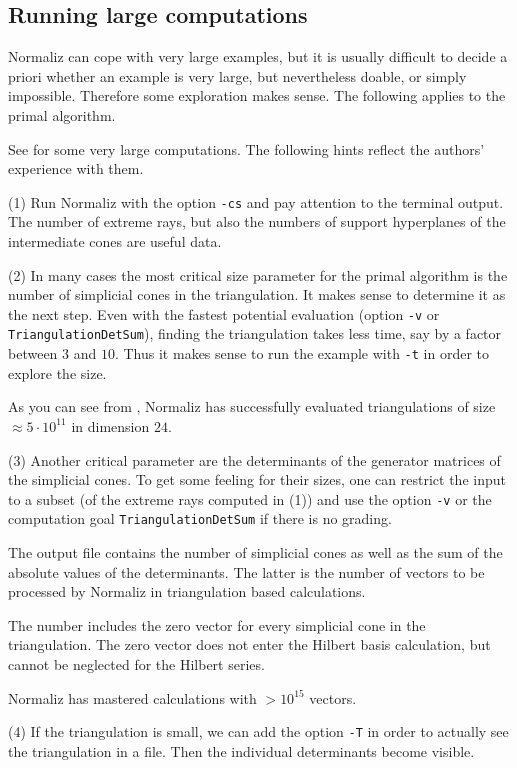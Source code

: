 \documentclass[12pt,a4paper]{scrartcl}
\theoremstyle{definition}
\def\ttt{\texttt}
\begin{document}
\subsection{Running large computations}\label{Large}

Normaliz can cope with very large examples, but  it
is usually difficult to decide a priori whether an example is
very large, but nevertheless doable, or simply impossible.
Therefore some exploration makes sense. The following applies to the primal algorithm.

See \cite{BIS} for some very large computations. The following
hints reflect the authors' experience with them.

(1) Run Normaliz with the option \ttt{-cs} and pay attention
to the terminal output. The number of extreme rays, but also
the numbers of support hyperplanes of the intermediate cones
are useful data.

(2) In many cases the most critical size parameter for the primal algorithm is the
number of simplicial cones in the triangulation. It makes sense
to determine it as the next step. Even with the fastest
potential evaluation (option \ttt{-v} or \verb|TriangulationDetSum|), finding the
triangulation takes less time, say by a factor between $3$ and
$10$. Thus it makes sense to run the example with \ttt{-t} in
order to explore the size.

As you can see from \cite{BIS}, Normaliz has successfully
evaluated triangulations of size $\approx 5\cdot 10^{11}$ in
dimension $24$.

(3) Another critical parameter are the determinants of the
generator matrices of the simplicial cones. To get some feeling
for their sizes, one can restrict the input to a subset (of the
extreme rays computed in (1)) and use the option \ttt{-v} or the computation goal \verb|TriangulationDetSum| if there is no grading.

The output file contains the number of simplicial cones as well
as the sum of the absolute values of the determinants. The
latter is the number of vectors to be processed by Normaliz
in triangulation based calculations.

The number includes the zero vector for every simplicial cone
in the triangulation. The zero vector does not enter the
Hilbert basis calculation, but cannot be neglected for the
Hilbert series.

Normaliz has mastered calculations with $> 10^{15}$ vectors.

(4) If the triangulation is small, we can add the option
\ttt{-T} in order to actually see the triangulation in a file.
Then the individual determinants become visible.
\end{document}
